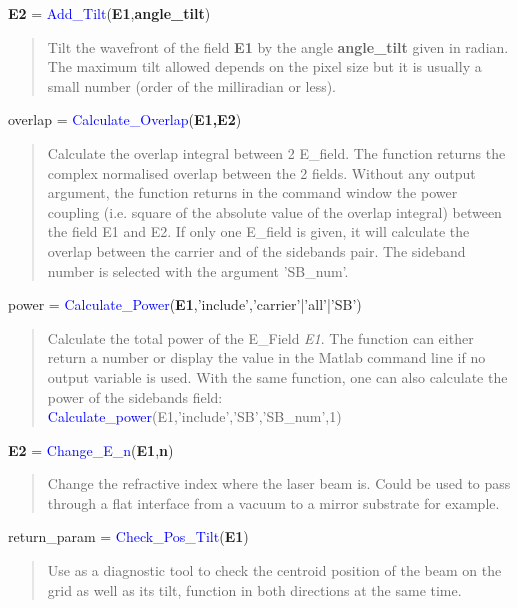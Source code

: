 \noindent \textbf{E2} = \textcolor{blue}{ Add\_Tilt}(\textbf{E1},\textbf{angle\_tilt})
\vspace*{-0.2cm}
\begin{quote}
Tilt the wavefront of the field \textbf{E1} by the angle \textbf{angle\_tilt} given in radian. The maximum tilt allowed depends on the pixel size but it is usually a small number (order of the milliradian or less).
\end{quote}

\noindent overlap = \textcolor{blue}{Calculate\_Overlap}(\textbf{E1,E2})
\vspace*{-0.2cm}
\begin{quote}
Calculate the overlap integral between 2 E\_field. The function returns the complex normalised overlap between the 2 fields. Without any output argument, the function returns in the command window the power coupling (i.e. square of the absolute value of the overlap integral) between the field E1 and E2.
If only one E\_field is given, it will calculate the overlap between the carrier and of the sidebands pair. The sideband number is selected with the argument 'SB\_num'.
\end{quote}

\noindent power = \textcolor{blue}{Calculate\_Power}(\textbf{E1},'include','carrier'|'all'|'SB')
\vspace*{-0.2cm}
\begin{quote}
Calculate the total power of the E\_Field \textsl{E1}. The function can either return a number or display the value in the Matlab command line if no output variable is used. With the same function, one can also calculate the power of the sidebands field:
\textcolor{blue}{Calculate\_power}(E1,'include','SB','SB\_num',1)
\end{quote}

\noindent \textbf{E2} = \textcolor{blue}{Change\_E\_n}(\textbf{E1},\textbf{n})
\vspace*{-0.2cm}
\begin{quote}
Change the refractive index where the laser beam is. Could be used to pass through a flat interface from a vacuum to a mirror substrate for example.
\end{quote}

\noindent return\_param = \textcolor{blue}{Check\_Pos\_Tilt}(\textbf{E1})
\vspace*{-0.2cm}
\begin{quote}
Use as a diagnostic tool to check the centroid position of the beam on the grid as well as its tilt, function in both directions at the same time.
\end{quote}

